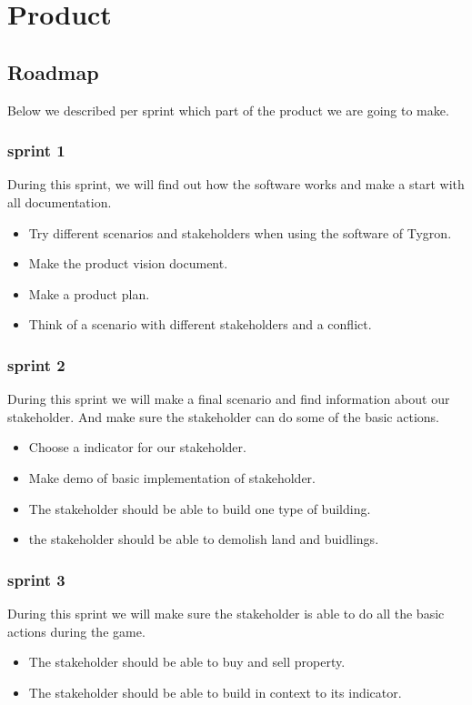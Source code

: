 \label{product}
\section{Product}

\subsection{Roadmap}
Below we described per sprint which part of the product we are going to make. \newline

\subsubsection{sprint 1}
During this sprint, we will find out how the software works and make a start with all documentation.
\begin{itemize}
	\item Try different scenarios and stakeholders when using the software of Tygron.
	\item Make the product vision document.
	\item Make a product plan.
	\item Think of a scenario with different stakeholders and a conflict.
\end{itemize}


\subsubsection{sprint 2}
During this sprint we will make a final scenario and find information about our stakeholder. And make sure the stakeholder can do some of the basic actions.
\begin{itemize}
	\item Choose a indicator for our stakeholder.
	\item Make demo of basic implementation of stakeholder.
	\item The stakeholder should be able to build one type of building.
	\item the stakeholder should be able to demolish land and buidlings.
\end{itemize}



\subsubsection{sprint 3}
During this sprint we will make sure the stakeholder is able to do all the basic actions during the game.
\begin{itemize}
	\item The stakeholder should be able to buy and sell property.
	\item The stakeholder should be able to build in context to its indicator.
\end{itemize}


